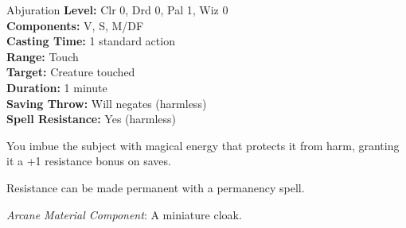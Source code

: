 {Abjuration}
{
	\textbf{Level:}
	Clr 0, Drd 0, Pal 1, Wiz 0\\
	\textbf{Components:}
	V, S, M/DF\\
	\textbf{Casting Time:}
	1 standard action\\
	\textbf{Range:}
	Touch\\
	\textbf{Target:}
	Creature touched\\
	\textbf{Duration:}
	1 minute\\
	\textbf{Saving Throw:}
	Will negates (harmless)\\
	\textbf{Spell Resistance:}
	Yes (harmless)\\
}
{
	You imbue the subject with magical energy that protects it from harm, granting it a +1 resistance bonus on saves.

	Resistance can be made permanent with a permanency spell.

	\textit{Arcane Material Component}:
	A miniature cloak.

}
